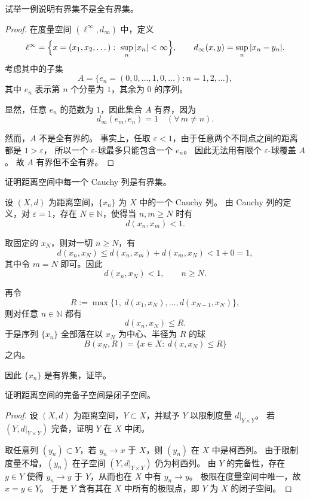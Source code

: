 \begin{homework}[第 8 题]
试举一例说明有界集不是全有界集。
\end{homework}

\begin{proof}
在度量空间 $(\ell^\infty, d_\infty)$ 中，定义
\[
\ell^\infty = \Bigl\{ x=(x_1,x_2,\dots):\ \sup_n |x_n|<\infty \Bigr\}, 
\qquad 
d_\infty(x,y) = \sup_n |x_n - y_n|.
\]
考虑其中的子集
\[
A = \{ e_n = (0,0,\dots,1,0,\dots): n=1,2,\dots \},
\]
其中 $e_n$ 表示第 $n$ 个分量为 $1$，其余为 $0$ 的序列。

显然，任意 $e_n$ 的范数为 $1$，因此集合 $A$ 有界，因为
\[
d_\infty(e_m,e_n) = 1 \quad (\forall\, m\ne n).
\]

然而，$A$ 不是全有界的。  
事实上，任取 $\varepsilon < 1$，由于任意两个不同点之间的距离都是 $1>\varepsilon$，
所以一个 $\varepsilon$-球最多只能包含一个 $e_n$。
因此无法用有限个 $\varepsilon$-球覆盖 $A$。
故 $A$ 有界但不全有界。
\end{proof}

\begin{homework}[第 9 题]
证明距离空间中每一个 Cauchy 列是有界集。
\end{homework}
\begin{solution}
设 $(X,d)$ 为距离空间，$\{x_n\}$ 为 $X$ 中的一个 Cauchy 列。  
由 Cauchy 列的定义，对 $\varepsilon=1$，存在 $N\in\mathbb{N}$，使得当
$n,m\ge N$ 时有
\[
d(x_n,x_m)<1.
\]

取固定的 $x_N$，则对一切 $n\ge N$，有
\[
d(x_n,x_N)\le d(x_n,x_m)+d(x_m,x_N)<1+0=1,
\]
其中令 $m=N$ 即可。因此
\[
d(x_n,x_N)<1,\qquad n\ge N.
\]

再令
\[
R:=\max\{1,\ d(x_1,x_N),\dots,d(x_{N-1},x_N)\},
\]
则对任意 $n\in\mathbb{N}$ 都有
\[
d(x_n,x_N)\le R.
\]
于是序列 $\{x_n\}$ 全部落在以 $x_N$ 为中心、半径为 $R$ 的球
\[
B(x_N,R)=\{x\in X:\ d(x,x_N)\le R\}
\]
之内。

因此 $\{x_n\}$ 是有界集，证毕。
\end{solution}
\begin{homework}[第 10 题]
证明距离空间的完备子空间是闭子空间。
\end{homework}

\begin{proof}
设 $(X,d)$ 为距离空间，$Y\subset X$，并赋予 $Y$ 以限制度量 $d|_{Y\times Y}$。
若 $(Y,d|_{Y\times Y})$ 完备，证明 $Y$ 在 $X$ 中闭。

取任意列 $(y_n)\subset Y$，若 $y_n\to x$ 于 $X$，则 $(y_n)$ 在 $X$ 中是柯西列。
由于限制度量不增，$(y_n)$ 在子空间 $(Y,d|_{Y\times Y})$ 仍为柯西列。
由 $Y$ 的完备性，存在 $y\in Y$ 使得 $y_n\to y$ 于 $Y$，从而也在 $X$ 中有 $y_n\to y$。
极限在度量空间中唯一，故 $x=y\in Y$。
于是 $Y$ 含有其在 $X$ 中所有的极限点，即 $Y$ 为 $X$ 的闭子空间。
\end{proof}

